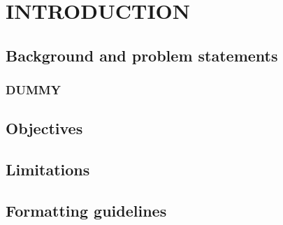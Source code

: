\documentclass[main]{subfiles}
\begin{document}
\chapter{INTRODUCTION}
\blindtext
\section{Background and problem statements}
	\blindtext
	\subsection{DUMMY}
	\blindtext
\section{Objectives}
\section{Limitations}
\section{Formatting guidelines}
\end{document}
